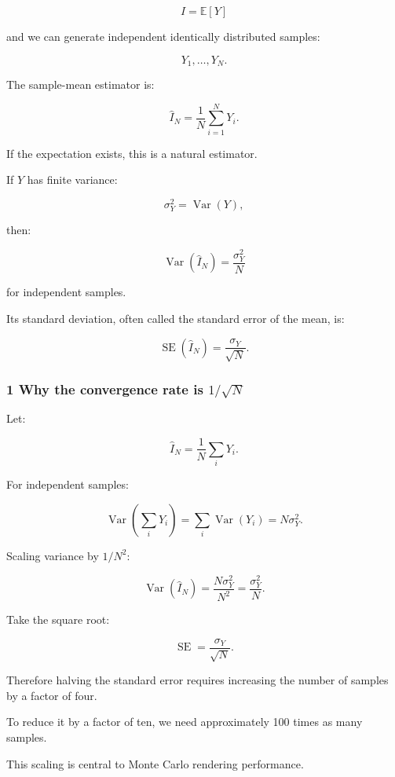 \[
 I=\mathbb E[Y]
\]

and we can generate independent identically distributed samples:

\[
 Y_1,\ldots,Y_N.
\]

The sample-mean estimator is:

\[
 \boxed{ \widehat I_N= \frac1N\sum_{i=1}^NY_i }.
\]

If the expectation exists, this is a natural estimator.

If \(Y\) has finite variance:

\[
 \sigma_Y^2=\operatorname{Var}(Y),
\]

then:

\[
 \boxed{ \operatorname{Var}(\widehat I_N) = \frac{\sigma_Y^2}{N} }
\]

for independent samples.

Its standard deviation, often called the standard error of the mean, is:

\[
 \boxed{ \operatorname{SE}(\widehat I_N) = \frac{\sigma_Y}{\sqrt N} }.
\]

\subsubsection{\texorpdfstring{1 Why the convergence rate is \(1/\sqrt N\)}{1 Why the convergence rate is 1/\textbackslash sqrt N}}\label{02-foundations-ii-ch030-why-the-convergence-rate-is-1sqrt-n}

\hypertarget{02-foundations-ii-ch030-why-the-convergence-rate-is-1sqrt-n}{}

Let:

\[
 \widehat I_N= \frac1N\sum_iY_i.
\]

For independent samples:

\[
 \operatorname{Var}\left(\sum_iY_i\right) = \sum_i\operatorname{Var}(Y_i) =N\sigma_Y^2.
\]

Scaling variance by \(1/N^2\):

\[
 \operatorname{Var}(\widehat I_N) = \frac{N\sigma_Y^2}{N^2} = \frac{\sigma_Y^2}{N}.
\]

Take the square root:

\[
 \operatorname{SE}= \frac{\sigma_Y}{\sqrt N}.
\]

Therefore halving the standard error requires increasing the number of samples by a factor of four.

To reduce it by a factor of ten, we need approximately 100 times as many samples.

This scaling is central to Monte Carlo rendering performance.

